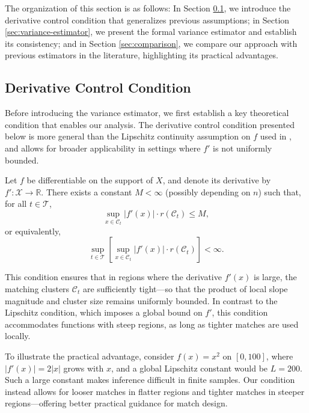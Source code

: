 \documentclass{mytemplate}
\begin{document}
The organization of this section is as follows: In Section \ref{sec:derivative-condition}, we introduce the derivative control condition that generalizes previous assumptions; in Section \ref{sec:variance-estimator}, we present the formal variance estimator and establish its consistency; and in Section \ref{sec:comparison}, we compare our approach with previous estimators in the literature, highlighting its practical advantages.


\subsection{Derivative Control Condition}
\label{sec:derivative-condition}

Before introducing the variance estimator, we first establish a key theoretical condition that enables our analysis. The derivative control condition presented below is more general than the Lipschitz continuity assumption on $f$ used in \cite{abadie2006large}, and allows for broader applicability in settings where $f'$ is not uniformly bounded.

\setcounter{assumption}{5}
\begin{assumption}
\label{assum:derivative-control}
Let $f$ be differentiable on the support of $X$, and denote its derivative by $f': \mathcal{X}\to \mathbb{R}$. 
There exists a constant $M < \infty$ (possibly depending on $n$) such that, for all $t \in \mathcal{T}$,
\[
\sup_{x \in \mathcal{C}_t} \bigl|f'(x)\bigr| \cdot r(\mathcal{C}_t) \le M,
\]
or equivalently,
\[
\sup_{t \in \mathcal{T}} \left[ \sup_{x \in \mathcal{C}_t} \bigl|f'(x)\bigr| \cdot r(\mathcal{C}_t) \right] < \infty.
\]
\end{assumption}

This condition ensures that in regions where the derivative $f'(x)$ is large, the matching clusters $\mathcal{C}_t$ are sufficiently tight—so that the product of local slope magnitude and cluster size remains uniformly bounded. In contrast to the Lipschitz condition, which imposes a global bound on $f'$, this condition accommodates functions with steep regions, as long as tighter matches are used locally.

To illustrate the practical advantage, consider $f(x) = x^2$ on $[0,100]$, where $|f'(x)| = 2|x|$ grows with $x$, and a global Lipschitz constant would be $L = 200$. Such a large constant makes inference difficult in finite samples. Our condition instead allows for looser matches in flatter regions and tighter matches in steeper regions—offering better practical guidance for match design.
\end{document}
